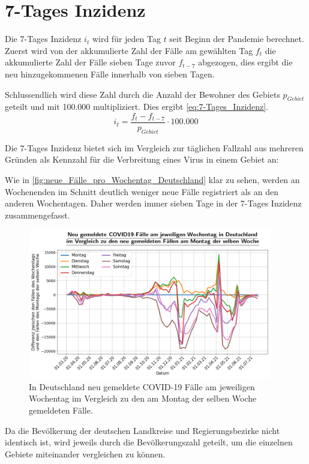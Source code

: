 \section{7-Tages Inzidenz}\label{sec:Datenaufbereitung}
Die 7-Tages Inzidenz $i_t$ wird für jeden Tag $t$ seit Beginn der Pandemie berechnet.
Zuerst wird von der akkumulierte Zahl der Fälle am gewählten Tag $f_t$ die akkumulierte Zahl der Fälle sieben Tage zuvor $f_{t-7}$ abgezogen, dies ergibt die neu hinzugekommenen Fälle innerhalb von sieben Tagen.

Schlussendlich wird diese Zahl durch die Anzahl der Bewohner des Gebiets $p_{Gebiet}$ geteilt und mit 100.000 multipliziert. Dies ergibt \autoref{eq:7-Tages_Inzidenz}.
\begin{equation}\label{eq:7-Tages_Inzidenz}
    i_t= \frac{f_t-f_{t-7}}{p_{Gebiet}}\cdot 100.000
\end{equation}

Die 7-Tages Inzidenz bietet sich im Vergleich zur täglichen Fallzahl aus mehreren Gründen als Kennzahl für die Verbreitung eines Virus in einem Gebiet an:

Wie in \autoref{fig:neue_Fälle_pro_Wochentag_Deutschland} klar zu sehen, werden an Wochenenden im Schnitt deutlich weniger neue Fälle registriert als an den anderen Wochentagen.
Daher werden immer sieben Tage in der 7-Tages Inzidenz zusammengefasst.
\begin{figure}[H]
    \centering
    \includegraphics[width=0.95\textwidth]{figures/Grundlagen/neue_Fälle_pro_Wochentag_Deutschland.png}
    \caption{In Deutschland neu gemeldete COVID-19 Fälle am jeweiligen Wochentag im Vergleich zu den am Montag der selben Woche gemeldeten Fälle.}
    \label{fig:neue_Fälle_pro_Wochentag_Deutschland}
\end{figure}
Da die Bevölkerung der deutschen Landkreise und Regierungsbezirke nicht identisch ist, wird jeweils durch die Bevölkerungszahl geteilt, um die einzelnen Gebiete miteinander vergleichen zu können.

